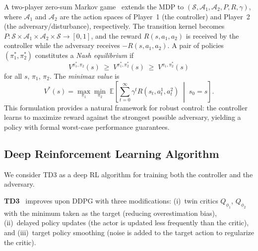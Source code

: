 \documentclass[conference]{IEEEtran}
\newcommand{\E}{\mathbb{E}}
\newcommand{\cS}{\mathcal{S}}
\newcommand{\cA}{\mathcal{A}}
\begin{document}
A two-player zero-sum Markov game~\cite{littman1994markov} extends the MDP
to $(\cS, \cA_1, \cA_2, P, R, \gamma)$, where $\cA_1$ and $\cA_2$ are
the action spaces of Player~1 (the controller) and Player~2 (the
adversary/disturbance), respectively.  The transition kernel becomes
$P: \cS \times \cA_1 \times \cA_2 \times \cS \to [0,1]$, and the reward
$R(s, a_1, a_2)$ is received by the controller while the adversary
receives $-R(s, a_1, a_2)$.  A pair of policies
$(\pi_1^*, \pi_2^*)$ constitutes a \emph{Nash equilibrium} if
\begin{equation}\label{eq:nash}
V^{\pi_1^*,\pi_2}(s) \;\geq\; V^{\pi_1^*,\pi_2^*}(s) \;\geq\;
V^{\pi_1,\pi_2^*}(s)
\end{equation}
for all $s$, $\pi_1$, $\pi_2$.  The \emph{minimax value} is
\begin{equation}\label{eq:minimax}
V^*(s) = \max_{\pi_1}\min_{\pi_2}\;
  \E\!\left[\sum_{t=0}^{\infty}\gamma^t R(s_t, a_t^1, a_t^2)
  \;\middle|\; s_0=s\right].
\end{equation}
This formulation provides a natural framework for robust control: the
controller learns to maximize reward against the strongest possible
adversary, yielding a policy with formal worst-case performance
guarantees.

\subsection{Deep Reinforcement Learning Algorithm}\label{sec:bg_drl}
We consider TD3 as a deep RL algorithm for training
both the controller and the adversary.


\textbf{TD3}~\cite{fujimoto2018addressing} improves upon DDPG with three
modifications: (i)~twin critics $Q_{\phi_1}$, $Q_{\phi_2}$ with the
minimum taken as the target (reducing overestimation bias), (ii)~delayed
policy updates (the actor is updated less frequently than the critic), and
(iii)~target policy smoothing (noise is added to the target action to
regularize the critic).
\end{document}
